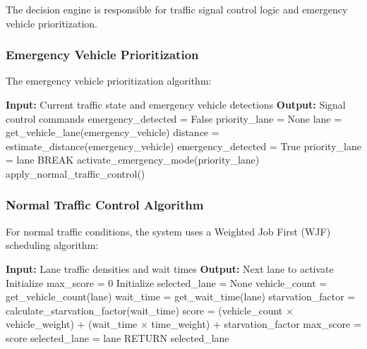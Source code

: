 The decision engine is responsible for traffic signal control logic and emergency vehicle prioritization.

\subsubsection{Emergency Vehicle Prioritization}

The emergency vehicle prioritization algorithm:

\begin{algorithmic}[1]
\STATE \textbf{Input:} Current traffic state and emergency vehicle detections
\STATE \textbf{Output:} Signal control commands
\STATE 
\STATE emergency\_detected = False
\STATE priority\_lane = None
\STATE 
{}
    \STATE lane = get\_vehicle\_lane(emergency\_vehicle)
    \STATE distance = estimate\_distance(emergency\_vehicle)
    \STATE 
        \STATE emergency\_detected = True
        \STATE priority\_lane = lane
        \STATE BREAK
    \ENDIF
\ENDFOR
\STATE 
{}
    \STATE activate\_emergency\_mode(priority\_lane)
\ELSE
    \STATE apply\_normal\_traffic\_control()
\ENDIF
\end{algorithmic}

\subsubsection{Normal Traffic Control Algorithm}

For normal traffic conditions, the system uses a Weighted Job First (WJF) scheduling algorithm:

\begin{algorithmic}[1]
\STATE \textbf{Input:} Lane traffic densities and wait times
\STATE \textbf{Output:} Next lane to activate
\STATE 
\STATE Initialize max\_score = 0
\STATE Initialize selected\_lane = None
\STATE 
{}
    \STATE vehicle\_count = get\_vehicle\_count(lane)
    \STATE wait\_time = get\_wait\_time(lane)
    \STATE starvation\_factor = calculate\_starvation\_factor(wait\_time)
    \STATE 
    \STATE score = (vehicle\_count × vehicle\_weight) + (wait\_time × time\_weight) + starvation\_factor
    \STATE 
        \STATE max\_score = score
        \STATE selected\_lane = lane
    \ENDIF
\ENDFOR
\STATE 
\STATE RETURN selected\_lane
\end{algorithmic}

